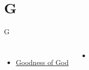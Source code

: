 \documentclass{beamer}
\begin{document}
\section{G}

\begin{frame}[t]{G}
\begin{columns}[t]
        \begin{itemize}
    \item \hyperlink{Goodness of God['All my life You have been faithful']}{Goodness of God } \phantom{ 1 1 1 1 1 1 1 1 1 1}
\end{itemize}
        \begin{itemize}
            \item[] \phantom{1}\end{itemize}


\end{columns}

\end{frame}
\end{document}
